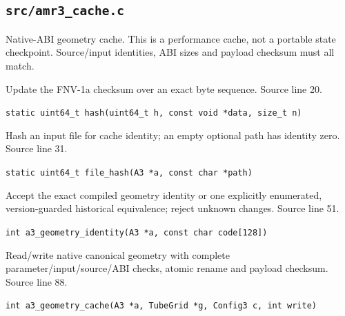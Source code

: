 \subsection{\texttt{src/amr3\_cache.c}}
Native-ABI geometry cache. This is a performance cache, not a portable state checkpoint. Source/input identities, ABI sizes and payload checksum must all match.
\begin{description}[style=nextline,leftmargin=0pt,labelindent=0pt,labelwidth=0pt,labelsep=0pt]
\item[\texttt{hash}] Update the FNV-1a checksum over an exact byte sequence. Source line 20.\par
{\small\nolinkurl{static uint64_t hash(uint64_t h, const void *data, size_t n)}}
\item[\texttt{file\_hash}] Hash an input file for cache identity; an empty optional path has identity zero. Source line 31.\par
{\small\nolinkurl{static uint64_t file_hash(A3 *a, const char *path)}}
\item[\texttt{a3\_geometry\_identity}] Accept the exact compiled geometry identity or one explicitly enumerated, version-guarded historical equivalence; reject unknown changes. Source line 51.\par
{\small\nolinkurl{int a3_geometry_identity(A3 *a, const char code[128])}}
\item[\texttt{a3\_geometry\_cache}] Read/write native canonical geometry with complete parameter/input/source/ABI checks, atomic rename and payload checksum. Source line 88.\par
{\small\nolinkurl{int a3_geometry_cache(A3 *a, TubeGrid *g, Config3 c, int write)}}
\end{description}
